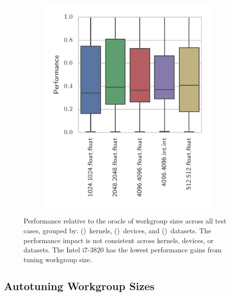 \documentclass[nonatbib,preprint,nocopyrightspace,9pt]{sigplanconf}
\begin{document}
\begin{figure}
\begin{subfigure}[h]{.48\columnwidth}
    \vspace{-1.5em} %
    \caption{}
    \label{fig:performance-devices}
  \end{subfigure}
  ~%
  \begin{subfigure}[h]{.48\columnwidth}
    \centering
    \includegraphics[width=\columnwidth]{img/performance_datasets.pdf}
    \vspace{-1.5em} %
    \caption{}
    \label{fig:performance-datasets}
  \end{subfigure}
  \caption{%
    Performance relative to the oracle of workgroup sizes across all
    test cases, grouped by:
    ()~kernels,
    ()~devices, and
    ()~datasets. The performance
    impact is not consistent across kernels, devices, or datasets. The
    Intel i7-3820 has the lowest performance gains from tuning
    workgroup size.%
  }
  \label{fig:performances}
\end{figure}

\subsection{Autotuning Workgroup Sizes}
\end{document}
